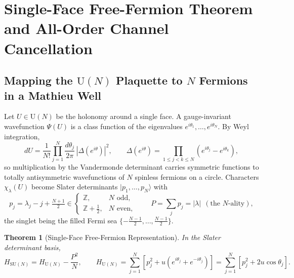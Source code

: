 \documentclass[11pt,a4paper]{article}
\newtheorem{theorem}{Theorem}[section]
\theoremstyle{definition}
\newcommand{\Z}{\mathbb{Z}}
\newcommand{\SU}{\mathrm{SU}}
\newcommand{\U}{\mathrm{U}}
\begin{document}
\section{Single-Face Free-Fermion Theorem and All-Order Channel Cancellation}\label{sec:fermion}

\subsection{Mapping the \texorpdfstring{$\U(N)$}{U(N)} Plaquette to \texorpdfstring{$N$}{N} Fermions in a Mathieu Well}

Let $U\in\U(N)$ be the holonomy around a single face. A gauge-invariant wavefunction $\Psi(U)$ is a class function of the eigenvalues $e^{i\theta_1},\dots,e^{i\theta_N}$. By Weyl integration,
\begin{equation}
  dU = \frac{1}{N!}\prod_{j=1}^N\frac{d\theta_j}{2\pi}\,|\Delta(e^{i\theta})|^2,
  \qquad \Delta(e^{i\theta}) = \prod_{1\le j<k\le N}(e^{i\theta_j} - e^{i\theta_k}),
\end{equation}
so multiplication by the Vandermonde determinant carries symmetric functions to totally antisymmetric wavefunctions of $N$ spinless fermions on a circle. Characters $\chi_\lambda(U)$ become Slater determinants $|p_1,\dots,p_N\rangle$ with
\begin{equation}
  p_j = \lambda_j - j + \tfrac{N+1}{2} \in
  \begin{cases}\Z, & N \text{ odd},\\[2pt] \Z + \tfrac12, & N \text{ even},\end{cases}
  \qquad P = \sum_j p_j = |\lambda| \ \ (\text{the } N\text{-ality}),
\end{equation}
the singlet being the filled Fermi sea $\{-\tfrac{N-1}{2},\dots,\tfrac{N-1}{2}\}$.

\begin{theorem}[Single-Face Free-Fermion Representation]\label{thm:free_fermion}
In the Slater determinant basis,
\begin{equation}\label{eq:H_SU_fermion}
  H_{\SU(N)} = H_{\U(N)} - \frac{P^2}{N},
  \qquad
  H_{\U(N)} = \sum_{j=1}^N\left[p_j^2 + u\left(e^{i\theta_j} + e^{-i\theta_j}\right)\right] = \sum_{j=1}^N\left[p_j^2 + 2u\cos\theta_j\right].
\end{equation}
\end{theorem}
\end{document}
